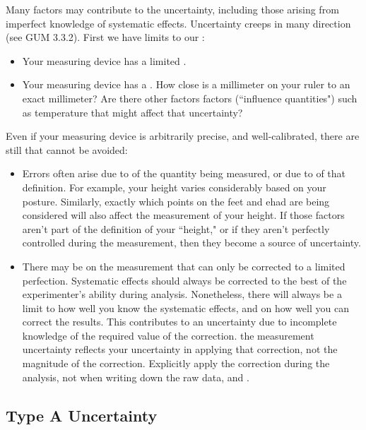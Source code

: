 \documentclass[12pt, a4paper, oneside, openright, titlepage]{book}
\begin{document}
\begin{appendices}
    Many factors may contribute to the uncertainty, including those arising from imperfect knowledge of systematic effects. Uncertainty creeps in many direction (see GUM 3.3.2). First we have limits to our :
    \begin{itemize}
        \item Your measuring device has a limited .
        \item Your measuring device has a . How close is a millimeter on your ruler to an exact millimeter? Are there other factors factors (``influence quantities") such as temperature that might affect that uncertainty?
    \end{itemize}
    \noindent Even if your measuring device is arbitrarily precise, and well-calibrated, there are still  that cannot be avoided:
    \begin{itemize}
        \item Errors often arise due to  of the quantity being measured, or due to  of that definition. For example, your height varies considerably based on your posture. Similarly, exactly which points on the feet and ehad are being considered will also affect the measurement of your height. If those factors aren't part of the definition of your ``height," or if they aren't perfectly controlled during the measurement, then they become a source of uncertainty.
        \item There may be  on the measurement that can only be corrected to a limited perfection. Systematic effects should always be corrected to the best of the experimenter's ability during analysis. Nonetheless, there will always be a limit to how well you know the systematic effects, and on how well you can correct the results. This contributes to an uncertainty due to incomplete knowledge of the required value of the correction.  the measurement uncertainty reflects your uncertainty in applying that correction, not the magnitude of the correction. Explicitly apply the correction during the analysis, not when writing down the raw data, and .
    \end{itemize}


    
    
    \subsection{Type A Uncertainty}


\end{appendices}
\end{document}
